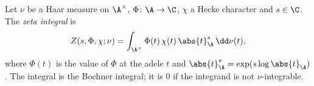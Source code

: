 Let $\nu$ be a Haar measure on $\A^\times$, $\Phi\colon\A\to\C$, $\chi$ a Hecke character and $s\in\C$. The
\emph{zeta integral} is
\[
  Z(s,\Phi,\chi;\nu)=\int_{\A^\times}\Phi(t)\,\chi(t)\,\abs{t}_\A^{s}\,\dd\nu(t),
\]
where $\Phi(t)$ is the value of $\Phi$ at the adele $t$ and $\abs{t}_\A^s=\exp(s\log\abs{t}_\A)$. The integral is the
Bochner integral; it is $0$ if the integrand is not $\nu$-integrable.
